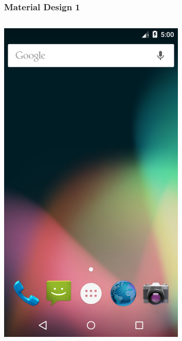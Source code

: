 \documentclass[12pt]{beamer}
\begin{document}
    \begin{frame}
        \frametitle{Material Design 1}
        \begin{columns}
            \begin{column}{0.3\textwidth}
                \includegraphics[width=0.7\textwidth]{android-5-0.png}
            \end{column}
            \begin{column}{0.3\textwidth}

\end{column}
\end{columns}
\end{frame}
\end{document}
